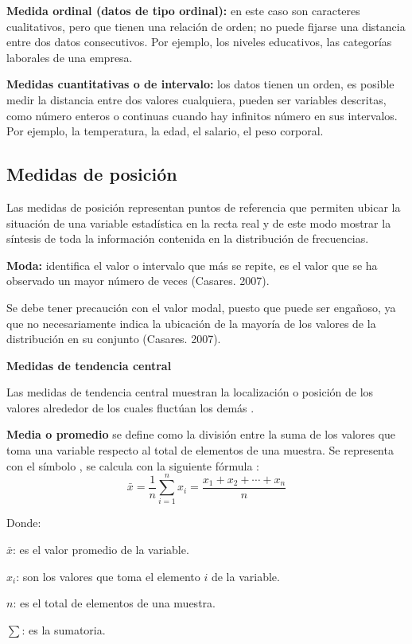 \documentclass[a5paper,doc,10pt,noapacite]{apa6}
\begin{document}
{{\textbf{Medida ordinal (datos de tipo ordinal):} en este caso son caracteres cualitativos, pero que tienen una relación de orden; no puede fijarse una distancia entre dos datos consecutivos. Por ejemplo, los niveles educativos, las categorías laborales de una empresa.

\textbf{Medidas cuantitativas o de intervalo:} los datos tienen un orden, es posible medir la distancia entre dos valores cualquiera, pueden ser variables descritas, como número enteros o continuas cuando hay infinitos número en sus intervalos. Por ejemplo, la temperatura, la edad, el salario,
el peso corporal.

\subsection{Medidas de posición}

Las medidas de posición representan puntos de referencia que permiten ubicar la situación de una variable estadística en la recta real y de este modo mostrar la síntesis de toda la información contenida en la distribución de frecuencias.

\textbf{Moda:} identifica el valor o intervalo que más se repite, es el valor que se ha observado un mayor número de veces (Casares. 2007).

Se debe tener precaución con el valor modal, puesto que puede ser engañoso, ya que no necesariamente indica la ubicación de la mayoría de los valores de la distribución en su conjunto (Casares. 2007).

\textbf{Medidas de tendencia central}

Las medidas de tendencia central muestran la localización o posición de los valores alrededor de los cuales fluctúan los demás \cite{Vargas-1995}.

\textbf{Media o promedio} se define como la división entre la suma de los valores que toma una variable respecto al total de elementos de una muestra. Se representa con el símbolo , se calcula con la siguiente fórmula \cite{Vargas-1995}:   
\[
	\bar{x}= \dfrac{1}{n} \sum \limits_{i=1}^{n} x_{i} = \dfrac{x_{1}+x_{2}+ \cdots+x_{n}}{n}
\]

Donde:
\begin{APAitemize}
\item \(\bar{x}\): es el valor promedio de la variable.
\item \(x_{i}\): son los valores que toma el elemento \(i\) de la variable.
\item \(n\): es el total de elementos de una muestra.
\item \(\sum\): es la sumatoria.
\end{APAitemize}

}}
\end{document}
